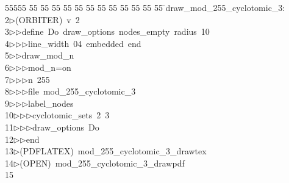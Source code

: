%
%
\begin{tabbing}
55555 \= 55 \= 55 \= 55 \= 55 \= 55 \= 55 \= 55 \= 55 \= 55 \= 55 \= 55 \= 55 \= \>draw\_mod\_255\_cyclotomic\_3:\\[0pt]
2\>$\triangleright$\>(ORBITER)\ v\ 2\ \\[0pt]
3\>$\triangleright$\>$\triangleright$\>define\ Do\ draw\_options\ nodes\_empty\ radius\ 10\ \\[0pt]
4\>$\triangleright$\>$\triangleright$\>$\triangleright$\>line\_width\ 04\ embedded\ end\ \\[0pt]
5\>$\triangleright$\>$\triangleright$\>draw\_mod\_n\ \\[0pt]
6\>$\triangleright$\>$\triangleright$\>$\triangleright$\>mod\_n=on\ \\[0pt]
7\>$\triangleright$\>$\triangleright$\>$\triangleright$\>n\ 255\ \\[0pt]
8\>$\triangleright$\>$\triangleright$\>$\triangleright$\>file\ mod\_255\_cyclotomic\_3\ \\[0pt]
9\>$\triangleright$\>$\triangleright$\>$\triangleright$\>label\_nodes\ \\[0pt]
10\>$\triangleright$\>$\triangleright$\>$\triangleright$\>cyclotomic\_sets\ 2\ 3\ \\[0pt]
11\>$\triangleright$\>$\triangleright$\>$\triangleright$\>draw\_options\ Do\ \\[0pt]
12\>$\triangleright$\>$\triangleright$\>end\ \\[0pt]
13\>$\triangleright$\>(PDFLATEX)\ mod\_255\_cyclotomic\_3\_drawtex\\[0pt]
14\>$\triangleright$\>(OPEN)\ mod\_255\_cyclotomic\_3\_drawpdf\\[0pt]
15\>\end{tabbing}
